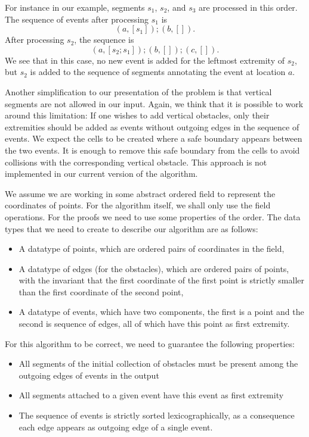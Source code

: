 \documentclass{easychair}
\begin{document}
For instance in our example, segments \(s_1\), \(s_2\), and \(s_3\) are
processed in this order.  The sequence of events after processing \(s_1\) is
\[ (a, [s_1]); (b, []).\]
After processing \(s_2\), the sequence is
\[ (a, [s_2; s_1]); (b, []); (c, []). \]
We see that in this case, no new event is added for the leftmost extremity
of \(s_2\), but \(s_2\) is added to the sequence of segments annotating the
event at location \(a\).

Another simplification to our presentation of the problem is that
vertical segments are not allowed in our input.  Again, we think that
it is possible to work around this limitation: If one wishes to add
vertical obstacles, only their extremities should be added as events
without outgoing edges in the sequence of events.  We expect the
cells to be created where a safe boundary appears between the two
events.  It is enough to remove this safe boundary from the cells to
avoid collisions with the corresponding vertical obstacle.  This
approach is not implemented in our current version of the algorithm.

We assume we are working in some abstract ordered field to represent the
coordinates of points.  For the algorithm itself, we shall only use the field
operations.  For the proofs we need to use some properties of the order.
The data types that we need to create to describe our algorithm are as
follows:
\begin{itemize}
\item A datatype of points, which are ordered pairs of coordinates in the field,
\item A datatype of edges (for the obstacles), which are ordered pairs of
  points, with the invariant that the first coordinate of the first
  point is strictly smaller than the first coordinate of the second point,
\item A datatype of events, which have two components, the first is a
  point and the second is sequence of edges, all of which have this
  point as first extremity.
\end{itemize}
For this algorithm to be correct, we need to guarantee the following
properties:
\begin{itemize}
\item All segments of the initial collection of obstacles must be
  present among the outgoing edges of events in the output
\item All segments attached to a given event have this event as first
  extremity
\item The sequence of events is strictly sorted lexicographically, as
  a consequence each edge appears as outgoing edge of a single event.
\end{itemize}
\end{document}
